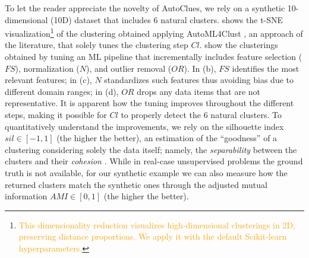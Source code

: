 \documentclass[runningheads]{llncs}
\begin{document}
To let the reader appreciate the novelty of AutoClues, we rely on a synthetic 10-dimensional (10D) dataset that includes 6 natural clusters.  shows the t-SNE \cite{van2008visualizing} visualization\footnote{\textcolor{orange}{This dimensionality reduction visualizes high-dimensional clusterings in 2D, preserving distance proportions. We apply it with the default Scikit-learn hyperparameters.}}  of the clustering obtained applying AutoML4Clust \cite{Tschechlov2021}, an approach of the literature, that solely tunes the clustering step $Cl$.  show the clusterings obtained by tuning an ML pipeline that incrementally includes feature selection ($FS$), normalization ($N$), and outlier removal ($OR$). In (b), $FS$ identifies the most relevant features; in (c), $N$ standardizes such features thus avoiding bias due to different domain ranges; in (d), $OR$ drops any data items that are not representative. 
It is apparent how the tuning improves throughout the different steps, making it possible for $Cl$ to properly detect the 6 natural clusters. 
To quantitatively understand the improvements, we rely on the silhouette index $sil \in [-1, 1]$ (the higher the better), an estimation of the ``goodness'' of a clustering considering solely the data itself; namely, the \textit{separability} between the clusters and their \textit{cohesion} \cite{zhu2010clustering}.
While in real-case unsupervised problems the ground truth is not available, for our synthetic example we can also measure how the returned clusters match the synthetic ones through the adjusted mutual information \cite{vinh2009information} $AMI \in [0, 1]$ (the higher the better).
\end{document}
